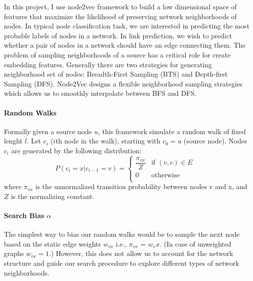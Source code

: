 \documentclass{report}
\begin{document}
In this project, I use node2vec framework to build a low dimensional space of features that maximize the likelihood of preserving network neighborhoods of nodes. In typical node classification task, we are interested in predicting the most probable labels of nodes in a network. In link prediction, we wish to predict whether a pair of nodes in a network should have an edge connecting them. The problem of sampling neighborhoods of a source has a critical role for create embedding features. Generally there are two strategies for generating neighborhood set of nodes: Breadth-First Sampling (BTS) and Depth-first Sampling (DFS). 
Node2Vec designs a flexible neighborhood sampling strategies which allows us to smoothly interpolate between BFS and DFS.
\paragraph{Random Walks}
Formally given a source node $u$, this framework simulate a random walk of fixed lenght $l$. Let $c_i$ ($i$th node in the walk), starting with $c_0=u$ (source node). Nodes $c_i$ are generated by the following distribution:
\[
P(c_i = x | c_{i-1} = v) =  
\begin{cases}
\dfrac{\pi_{vx}}{Z} & \text{if $(v,c) \in E$ }\\
0 &\text{otherwise}\\
\end{cases}
\]
where $\pi_{vx}$ is the unnormalized transition probability between nodes v and x, and $Z$ is the normalizing constant.
\paragraph{Search Bias $\alpha$}
The simplest way to bias our random walks would be to sample
the next node based on the static edge weights $w_{vx}$ i.e., $π_{vx}$ = $w_vx$.
(In case of unweighted graphs $w_{vx} = 1$.) However, this does not allow us to account for the network structure and guide our search procedure to explore different types of network neighborhoods.
\end{document}
